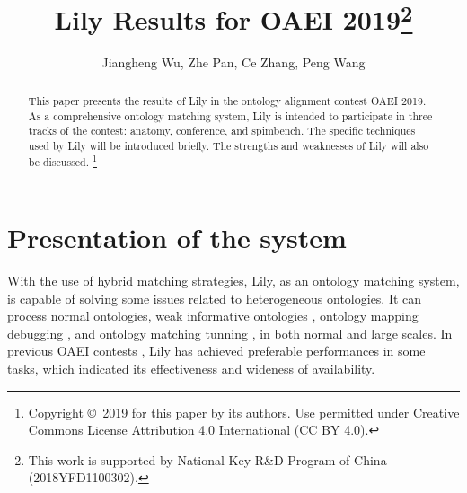 \documentclass[runningheads]{llncs}
\begin{document}
\title{Lily Results for OAEI 2019\thanks{This work is supported by National Key R\&D Program of China (2018YFD1100302). }}
\author{Jiangheng Wu, Zhe Pan, Ce Zhang, Peng Wang}

\maketitle
\newcommand\blfootnote[1]{%
\begingroup
\renewcommand\thefootnote{}\footnote{#1}%
\addtocounter{footnote}{-1}%
\endgroup
}
\begin{abstract}
This paper presents the results of Lily in the ontology alignment contest OAEI 2019. 
As a comprehensive ontology matching system, Lily is intended to participate in three tracks of the contest: anatomy, conference, and spimbench. 
The specific techniques used by Lily will be introduced briefly. 
The strengths and weaknesses of Lily will also be discussed. \blfootnote{\noindent Copyright \copyright\ 2019 for this paper by its authors. Use permitted under Creative Commons License Attribution 4.0 International (CC BY 4.0).}
\end{abstract}

\section{Presentation of the system}
With the use of hybrid matching strategies, Lily, as an ontology matching system, is capable of solving some issues related to heterogeneous ontologies. 
It can process normal ontologies, weak informative ontologies \cite{wang2009effective}, ontology mapping debugging \cite{wang2012debugging}, and ontology matching tunning \cite{yang2014ontology}, in both normal and large scales. 
In previous OAEI contests \cite{lily_oaei2018, lily_oaei2016, lily_oaei2015, lily_oaei2011, lily_oaei2009,lily_oaei2008,lily_oaei2007}, Lily has achieved preferable performances in some tasks, which indicated its effectiveness and wideness of availability. \par
\end{document}
